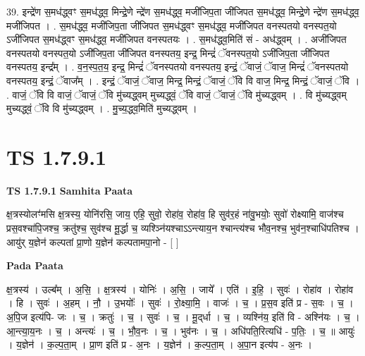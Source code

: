 \documentclass[17pt]{extarticle}
\begin{document}
39. इन्द्रे॑ण स॒मध॑द्ध्वꣳ स॒मध॑द्ध्व॒ मिन्द्रे॒णे न्द्रे॑ण स॒मध॑द्ध्व॒ मजी॑जिप॒ता जी॑जिपत स॒मध॑द्ध्व॒ मिन्द्रे॒णे न्द्रे॑ण स॒मध॑द्ध्व॒ मजी॑जिपत । . स॒मध॑द्ध्व॒ मजी॑जिप॒ता जी॑जिपत स॒मध॑द्ध्वꣳ स॒मध॑द्ध्व॒ मजी॑जिपत वनस्पतयो वनस्पत॒यो ऽजी॑जिपत स॒मध॑द्ध्वꣳ स॒मध॑द्ध्व॒ मजी॑जिपत वनस्पतयः । . स॒मध॑द्ध्व॒मिति॑ सं - अध॑द्ध्वम् । . अजी॑जिपत वनस्पतयो वनस्पत॒यो ऽजी॑जिप॒ता जी॑जिपत वनस्पतय॒ इन्द्र॒ मिन्द्रं॑ ॅवनस्पत॒यो ऽजी॑जिप॒ता जी॑जिपत वनस्पतय॒ इन्द्र᳚म् । . व॒न॒स्प॒त॒य॒ इन्द्र॒ मिन्द्रं॑ ॅवनस्पतयो वनस्पतय॒ इन्द्रं॒ ॅवाजं॒ ॅवाज॒ मिन्द्रं॑ ॅवनस्पतयो वनस्पतय॒ इन्द्रं॒ ॅवाज᳚म् । . इन्द्रं॒ ॅवाजं॒ ॅवाज॒ मिन्द्र॒ मिन्द्रं॒ ॅवाजं॒ ॅवि वि वाज॒ मिन्द्र॒ मिन्द्रं॒ ॅवाजं॒ ॅवि । . वाजं॒ ॅवि वि वाजं॒ ॅवाजं॒ ॅवि मु॑च्यद्ध्वम् मुच्यद्ध्वं॒ ॅवि वाजं॒ ॅवाजं॒ ॅवि मु॑च्यद्ध्वम् । . वि मु॑च्यद्ध्वम् मुच्यद्ध्वं॒ ॅवि वि मु॑च्यद्ध्वम् । . मु॒च्य॒द्ध्व॒मिति॑ मुच्यद्ध्वम् । \newline
\pagebreak
{}

\section{ TS 1.7.9.1 }

\textbf{TS 1.7.9.1 } \newline
\textbf{Samhita Paata} \newline

क्ष॒त्रस्योलꣳ॑मसि क्ष॒त्रस्य॒ योनि॑रसि॒ जाय॒ एहि॒ सुवो॒ रोहा॑व॒ रोहा॑व॒ हि सुव॑र॒हं ना॑वु॒भयोः॒ सुवो॑ रोक्ष्यामि॒ वाज॑श्च प्रस॒वश्चा॑पि॒जश्च॒ क्रतु॑श्च॒ सुव॑श्च मू॒र्द्धा च॒ व्यश्ञ्नि॑यश्चाऽऽन्त्याय॒न श्चान्त्य॑श्च भौव॒नश्च॒ भुव॑न॒श्चाधि॑पतिश्च । आयु॑र् य॒ज्ञेन॑ कल्पतां प्रा॒णो य॒ज्ञेन॑ कल्पतामपा॒नो - [ ] \newline

\textbf{Pada Paata} \newline

क्ष॒त्रस्य॑ । उल्ब᳚म् । अ॒सि॒ । क्ष॒त्रस्य॑ । योनिः॑ । अ॒सि॒ । जाये᳚ । एति॑ । इ॒हि॒ । सुवः॑ । रोहा॑व । रोहा॑व । हि । सुवः॑ । अ॒हम् । नौ॒ । उ॒भयोः᳚ । सुवः॑ । रो॒क्ष्या॒मि॒ । वाजः॑ । च॒ । प्र॒स॒व इति॑ प्र - स॒वः । च॒ । अ॒पि॒ज इत्य॑पि- जः । च॒ । क्रतुः॑ । च॒ । सुवः॑ । च॒ । मू॒द्‌र्धा । च॒ । व्यश्नि॑य॒ इति॑ वि - अश्नि॑यः । च॒ । आ॒न्त्या॒य॒नः । च॒ । अन्त्यः॑ । च॒ । भौ॒व॒नः । च॒ । भुव॑नः । च॒ । अधि॑पति॒रित्यधि॑ - प॒तिः॒ । च॒ ॥ आयुः॑ । य॒ज्ञेन॑ । क॒ल्प॒ता॒म् । प्रा॒ण इति॑ प्र - अ॒नः । य॒ज्ञेन॑ । क॒ल्प॒ता॒म् । अ॒पा॒न इत्य॑प - अ॒नः ।  \newline
\end{document}
